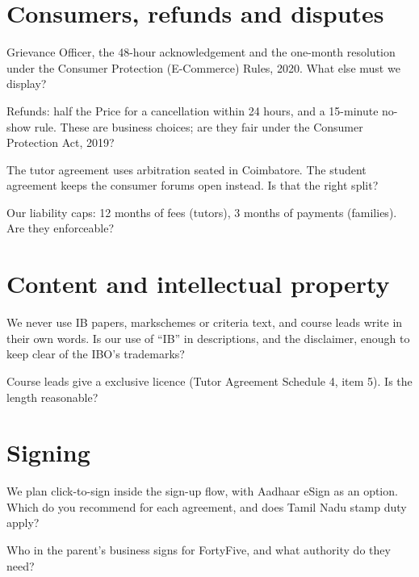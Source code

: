 \documentclass[11pt]{article}
\begin{document}
\section{Consumers, refunds and disputes}
\begin{clauses}
  \item Grievance Officer, the 48-hour acknowledgement and the one-month resolution under the Consumer Protection (E-Commerce) Rules, 2020. What else must we display?
  \item Refunds: half the Price for a cancellation within 24 hours, and a 15-minute no-show rule. These are business choices; are they fair under the Consumer Protection Act, 2019?
  \item The tutor agreement uses arbitration seated in Coimbatore. The student agreement keeps the consumer forums open instead. Is that the right split?
  \item Our liability caps: 12 months of fees (tutors), 3 months of payments (families). Are they enforceable?
\end{clauses}

\section{Content and intellectual property}
\begin{clauses}
  \item We never use IB papers, markschemes or criteria text, and course leads write in their own words. Is our use of ``IB'' in descriptions, and the disclaimer, enough to keep clear of the IBO's trademarks?
  \item Course leads give a  exclusive licence (Tutor Agreement Schedule 4, item 5). Is the length reasonable?
\end{clauses}

\section{Signing}
\begin{clauses}
  \item We plan click-to-sign inside the sign-up flow, with Aadhaar eSign as an option. Which do you recommend for each agreement, and does Tamil Nadu stamp duty apply?
  \item Who in the parent's business signs for FortyFive, and what authority do they need?
\end{clauses}
\end{document}
